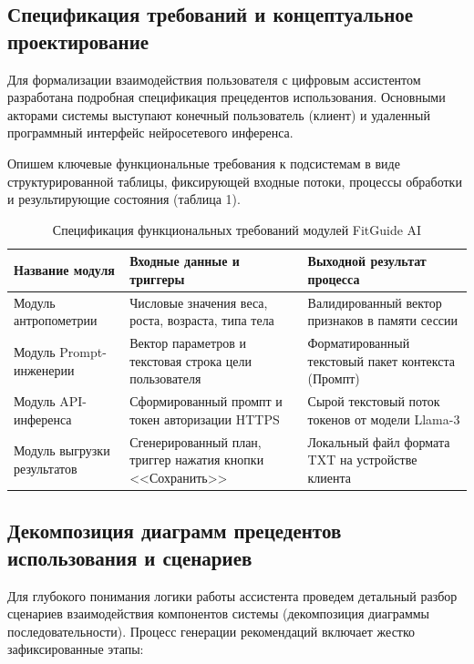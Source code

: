 \documentclass[14pt, a4paper]{extarticle}
\begin{document}
\subsection{Спецификация требований и концептуальное проектирование}

Для формализации взаимодействия пользователя с цифровым ассистентом разработана подробная спецификация прецедентов использования. Основными акторами системы выступают конечный пользователь (клиент) и удаленный программный интерфейс нейросетевого инференса. 

Опишем ключевые функциональные требования к подсистемам в виде структурированной таблицы, фиксирующей входные потоки, процессы обработки и результирующие состояния (таблица 1).

\begin{table}[h!]
\centering
\caption{Спецификация функциональных требований модулей FitGuide AI}
\bigskip
\begin{tabular}{|p{4cm}|p{5cm}|p{5cm}|}
\hline
\textbf{Название модуля} & \textbf{Входные данные и триггеры} & \textbf{Выходной результат процесса} \\ \hline
Модуль антропометрии & Числовые значения веса, роста, возраста, типа тела & Валидированный вектор признаков в памяти сессии \\ \hline
Модуль Prompt-инженерии & Вектор параметров и текстовая строка цели пользователя & Форматированный текстовый пакет контекста (Промпт) \\ \hline
Модуль API-инференса & Сформированный промпт и токен авторизации HTTPS & Сырой текстовый поток токенов от модели Llama-3 \\ \hline
Модуль выгрузки результатов & Сгенерированный план, триггер нажатия кнопки <<Сохранить>> & Локальный файл формата TXT на устройстве клиента \\ \hline
\end{tabular}
\end{table}


\subsection{Декомпозиция диаграмм прецедентов использования и сценариев}

Для глубокого понимания логики работы ассистента проведем детальный разбор сценариев взаимодействия компонентов системы (декомпозиция диаграммы последовательности). Процесс генерации рекомендаций включает жестко зафиксированные этапы:
\end{document}
